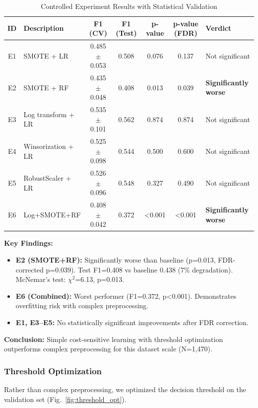 \documentclass[conference]{IEEEtran}
\begin{document}
\begin{table}[!t]
\caption{Controlled Experiment Results with Statistical Validation}
\label{tab:experiment_results}
\centering
\small
\begin{tabular}{clccccl}
\toprule
\textbf{ID} & \textbf{Description} & \textbf{F1 (CV)} & \textbf{F1 (Test)} & \textbf{p-value} & \textbf{p-value (FDR)} & \textbf{Verdict} \\
\midrule
E1 & SMOTE + LR & 0.485 $\pm$ 0.053 & 0.508 & 0.076 & 0.137 & Not significant \\
E2 & SMOTE + RF & 0.435 $\pm$ 0.048 & 0.408 & 0.013 & 0.039 & \textbf{Significantly worse} \\
E3 & Log transform + LR & 0.535 $\pm$ 0.101 & 0.562 & 0.874 & 0.874 & Not significant \\
E4 & Winsorization + LR & 0.525 $\pm$ 0.098 & 0.544 & 0.500 & 0.600 & Not significant \\
E5 & RobustScaler + LR & 0.526 $\pm$ 0.096 & 0.548 & 0.327 & 0.490 & Not significant \\
E6 & Log+SMOTE+RF & 0.408 $\pm$ 0.042 & 0.372 & <0.001 & <0.001 & \textbf{Significantly worse} \\
\bottomrule
\end{tabular}
\end{table}

\textbf{Key Findings:}
\begin{itemize}
    \item \textbf{E2 (SMOTE+RF):} Significantly worse than baseline (p=0.013, FDR-corrected p=0.039). Test F1=0.408 vs baseline 0.438 (7\% degradation). McNemar's test: $\chi^2$=6.13, p=0.013.
    \item \textbf{E6 (Combined):} Worst performer (F1=0.372, p<0.001). Demonstrates overfitting risk with complex preprocessing.
    \item \textbf{E1, E3--E5:} No statistically significant improvements after FDR correction.
\end{itemize}

\textbf{Conclusion:} Simple cost-sensitive learning with threshold optimization outperforms complex preprocessing for this dataset scale (N=1,470).

\subsubsection{Threshold Optimization}

Rather than complex preprocessing, we optimized the decision threshold on the validation set (Fig.~\ref{fig:threshold_opt}).
\end{document}

